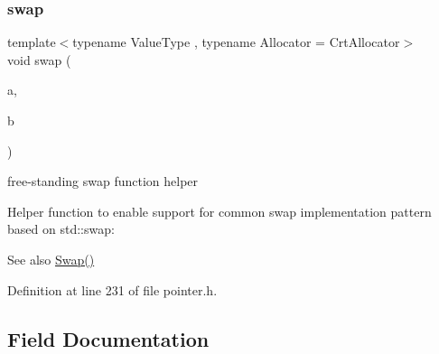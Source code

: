 \subsubsection{\texorpdfstring{swap}{swap}}
{\footnotesize\ttfamily template$<$typename Value\+Type , typename Allocator  = Crt\+Allocator$>$ \\
void swap (\begin{DoxyParamCaption}\item[{\mbox{\hyperlink{classrapidjson_1_1_generic_pointer}{Generic\+Pointer}}$<$ Value\+Type, \mbox{\hyperlink{classrapidjson_1_1_allocator}{Allocator}} $>$ \&}]{a,  }\item[{\mbox{\hyperlink{classrapidjson_1_1_generic_pointer}{Generic\+Pointer}}$<$ Value\+Type, \mbox{\hyperlink{classrapidjson_1_1_allocator}{Allocator}} $>$ \&}]{b }\end{DoxyParamCaption})\hspace{0.3cm}{\ttfamily [friend]}}



free-\/standing swap function helper 

Helper function to enable support for common swap implementation pattern based on {\ttfamily std\+::swap\+:} 
\begin{DoxyCode}{0}
\DoxyCodeLine{    \textcolor{comment}{// ...}}
\DoxyCodeLine{\}}
\end{DoxyCode}
 \begin{DoxySeeAlso}{See also}
\mbox{\hyperlink{classrapidjson_1_1_generic_pointer_a91762c063f390c1463eb772dfd1b822b}{Swap()}} 
\end{DoxySeeAlso}


Definition at line 231 of file pointer.\+h.


\begin{DoxyCode}{0}

\end{DoxyCode}


\subsection{Field Documentation}
\mbox{\label{classrapidjson_1_1_generic_pointer_a3e671447cf032271956fa984aad23ef7}} 
